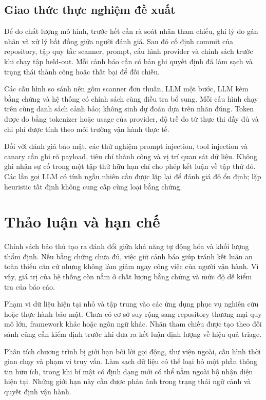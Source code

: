 \documentclass[11pt,a4paper]{article}
\begin{document}
\subsection{Giao thức thực nghiệm đề xuất}
Để đo chất lượng mô hình, trước hết cần rà soát nhãn tham chiếu, ghi lý do gán nhãn và xử lý bất đồng giữa người đánh giá. Sau đó cố định commit của repository, tập quy tắc scanner, prompt, cấu hình provider và chính sách trước khi chạy tập held-out. Mỗi cảnh báo cần có bản ghi quyết định đã làm sạch và trạng thái thành công hoặc thất bại để đối chiếu.

Các cấu hình so sánh nên gồm scanner đơn thuần, LLM một bước, LLM kèm bằng chứng và hệ thống có chính sách cùng điều tra bổ sung. Mỗi cấu hình chạy trên cùng danh sách cảnh báo; không sinh dự đoán dựa trên nhãn đúng. Token được đo bằng tokenizer hoặc usage của provider, độ trễ đo từ thực thi đầy đủ và chi phí được tính theo môi trường vận hành thực tế.

Đối với đánh giá bảo mật, các thử nghiệm prompt injection, tool injection và canary cần ghi rõ payload, tiêu chí thành công và vị trí quan sát dữ liệu. Không ghi nhận sự cố trong một tập thử hữu hạn chỉ cho phép kết luận về tập thử đó. Các lần gọi LLM có tính ngẫu nhiên cần được lặp lại để đánh giá độ ổn định; lặp heuristic tất định không cung cấp cùng loại bằng chứng.

\section{Thảo luận và hạn chế}
Chính sách bảo thủ tạo ra đánh đổi giữa khả năng tự động hóa và khối lượng thẩm định. Nếu bằng chứng chưa đủ, việc giữ cảnh báo giúp tránh kết luận an toàn thiếu căn cứ nhưng không làm giảm ngay công việc của người vận hành. Vì vậy, giá trị của hệ thống còn nằm ở chất lượng bằng chứng và mức độ dễ kiểm tra của báo cáo.

Phạm vi dữ liệu hiện tại nhỏ và tập trung vào các ứng dụng phục vụ nghiên cứu hoặc thực hành bảo mật. Chưa có cơ sở suy rộng sang repository thương mại quy mô lớn, framework khác hoặc ngôn ngữ khác. Nhãn tham chiếu được tạo theo đối sánh cũng cần kiểm định trước khi đưa ra kết luận định lượng về hiệu quả triage.

Phân tích chương trình bị giới hạn bởi lời gọi động, thư viện ngoài, cấu hình thời gian chạy và phạm vi truy vấn. Làm sạch dữ liệu có thể loại bỏ một phần thông tin hữu ích, trong khi bí mật có định dạng mới có thể nằm ngoài bộ nhận diện hiện tại. Những giới hạn này cần được phản ánh trong trạng thái ngữ cảnh và quyết định vận hành.
\end{document}
